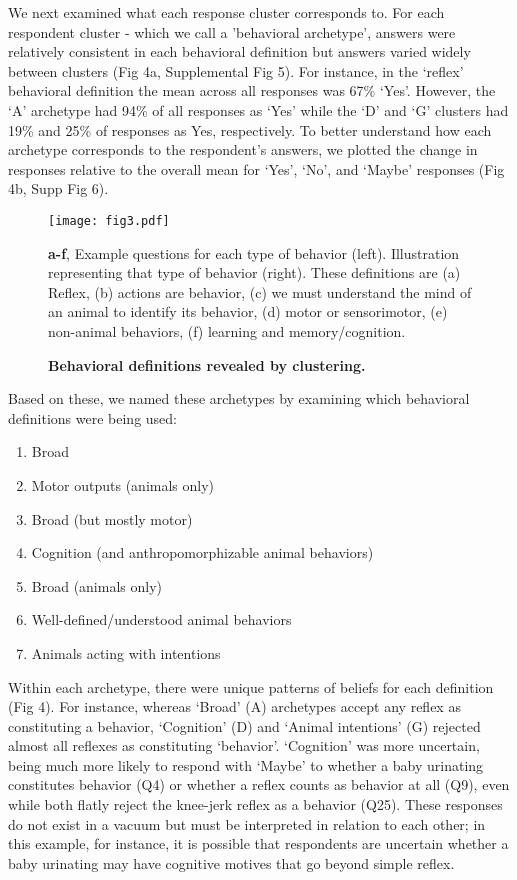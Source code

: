 \documentclass[a4paper, 11pt]{article}
\begin{document}
We next examined what each response cluster corresponds to. For each respondent cluster - which we call a 'behavioral archetype', answers were relatively consistent in each behavioral definition but answers varied widely between clusters (Fig 4a, Supplemental Fig 5). For instance, in the `reflex' behavioral definition the mean across all responses was 67\% `Yes'. However, the `A' archetype had 94\% of all responses as `Yes' while the `D' and `G' clusters had 19\% and 25\% of responses as Yes, respectively. To better understand how each archetype corresponds to the respondent's answers, we plotted the change in responses relative to the overall mean for `Yes', `No', and `Maybe' responses (Fig 4b, Supp Fig 6).

\begin{figure}
\centerline{\texttt{[image: fig3.pdf]}}
\caption{\textbf{Behavioral definitions revealed by clustering.}} \textbf{a-f}, Example questions for each type of behavior (left). Illustration representing that type of behavior (right). These definitions are (a) Reflex, (b) actions are behavior, (c) we must understand the mind of an animal to identify its behavior, (d) motor or sensorimotor, (e) non-animal behaviors, (f) learning and memory/cognition.
\end{figure}

Based on these, we named these archetypes by examining which behavioral definitions were being used:

  \begin{enumerate}[label=\Alph*]
    \item Broad
    
    \item Motor outputs (animals only)

    \item Broad (but mostly motor)

    \item Cognition (and anthropomorphizable animal behaviors)
    
    \item Broad (animals only)
    
    \item Well-defined/understood animal behaviors

    \item Animals acting with intentions
\end{enumerate}

Within each archetype, there were unique patterns of beliefs for each definition (Fig 4). For instance, whereas `Broad' (A) archetypes accept any reflex as constituting a behavior, `Cognition' (D) and `Animal intentions' (G) rejected almost all reflexes as constituting `behavior'.  `Cognition' was more uncertain, being much more likely to respond with `Maybe' to whether a baby urinating constitutes behavior (Q4) or whether a reflex counts as behavior at all (Q9), even while both flatly reject the knee-jerk reflex as a behavior (Q25). These responses do not exist in a vacuum but must be interpreted in relation to each other; in this example, for instance, it is possible that respondents are uncertain whether a baby urinating may have cognitive motives that go beyond simple reflex.
\end{document}
